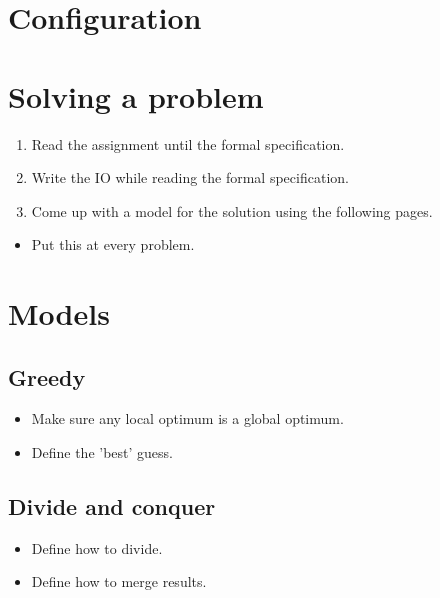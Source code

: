 \documentclass[guide.tex]{subfiles}
\begin{document}
\section{Configuration}



\section{Solving a problem}

{\Huge

\begin{enumerate}
  \item Read the assignment until the formal specification.
  \item Write the IO while reading the formal specification.
  \item Come up with a model for the solution using the following pages.
\end{enumerate}

}

\begin{itemize}
\item Put this at every problem.
  \newline {}
\end{itemize}
\pagebreak

\section{Models}

\subsection{Greedy}
\begin{itemize}
  \item Make sure any local optimum is a global optimum.
  \item Define the 'best' guess.
\end{itemize}

\subsection{Divide and conquer}
\begin{itemize}
  \item Define how to divide.
  \item Define how to merge results.
\end{itemize}
\end{document}
